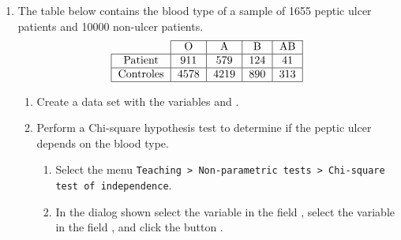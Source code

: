 \begin{enumerate}[leftmargin=*]



\item The table below contains the blood type of a sample of 1655 peptic ulcer patients and 10000 non-ulcer patients.
\[
\begin{tabular}{|l|l|l|l|l|}
\cline{2-5}
\multicolumn{1}{c|}{} & \multicolumn{1}{c|}{O} & \multicolumn{1}{c|}{A} & \multicolumn{1}{c|}{B} & \multicolumn{1}{c|}{AB} \\
\hline
\multicolumn{1}{|c|}{Patient} & \multicolumn{1}{c|}{911} & \multicolumn{1}{c|}{579} & \multicolumn{1}{c|}{124} & \multicolumn{1}{c|}{41} \\
\hline
\multicolumn{1}{|c|}{Controles} & \multicolumn{1}{c|}{4578} & \multicolumn{1}{c|}{4219} & \multicolumn{1}{c|}{890} & \multicolumn{1}{c|}{313} \\
\hline
\end{tabular}
\]

\begin{enumerate}
\item Create a data set with the variables  and .

\item Perform a Chi-square hypothesis test to determine if the peptic ulcer depends on the blood type.
\begin{indication}
\begin{enumerate}
\item Select the menu \texttt{Teaching > Non-parametric tests > Chi-square test of inde\-pendence}.
\item In the dialog shown select the variable  in the field
, select the variable  in the field , and click the button .
\end{enumerate}
\end{indication}


\end{enumerate}
\end{enumerate}
